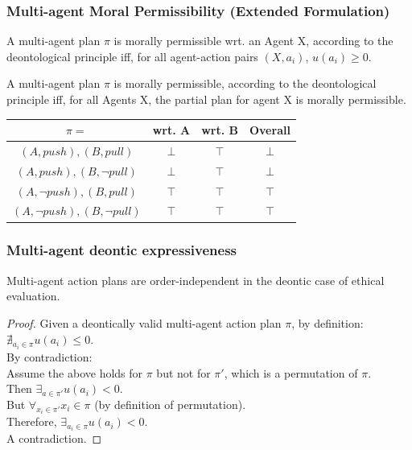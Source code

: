 \documentclass{beamer}
\begin{document}
\begin{frame}
\frametitle{Multi-agent Moral Permissibility (Extended Formulation)}
\begin{definition}
A multi-agent plan $\pi$ is morally permissible wrt. an Agent X, according to the deontological principle iff, for all agent-action pairs $(X,a_i)$, $u(a_i) \geq 0$.
\end{definition}

\begin{definition}
A multi-agent plan $\pi$ is morally permissible, according to the deontological principle iff, for all Agents X, the partial plan for agent X is morally permissible.
\end{definition}


\begin{center}
\begin{tabular}{ |c|c|c|c| } 
 \hline
 $\pi=$ & wrt. A & wrt. B & Overall \\ 
 \hline
 $(A,push), (B, pull)$ & $\bot$ & $\top$ & $\bot$\\ 
 \hline
 $(A,push), (B, \lnot pull)$ & $\bot$ & $\top$ & $\bot$\\ 
 \hline
 $(A,\lnot push), (B, pull)$ & $\top$ & $\top$ & $\top$\\ 
 \hline
 $(A,\lnot push), (B, \lnot pull)$ & $\top$ & $\top$ & $\top$\\ 
 \hline
\end{tabular}
\end{center}

\end{frame}

\begin{frame}
\frametitle{Multi-agent deontic expressiveness}
\begin{theorem}
Multi-agent action plans are order-independent in the deontic case of ethical evaluation.
\end{theorem}
\begin{proof}
Given a deontically valid multi-agent action plan $\pi$, by definition: $\nexists_{a_i \in \pi} u(a_i) \leq 0$.\\
By contradiction:\\
Assume the above holds for $\pi$ but not for $\pi'$, which is a permutation of $\pi$.\\
Then $\exists_{a\in \pi'} u(a_i)<0$.\\
But $\forall_{x_i \in \pi'} x_i \in \pi$ (by definition of permutation).\\
Therefore, $\exists_{a_i \in \pi} u(a_i)<0$.\\
A contradiction.
\end{proof}
\end{frame}
\end{document}
